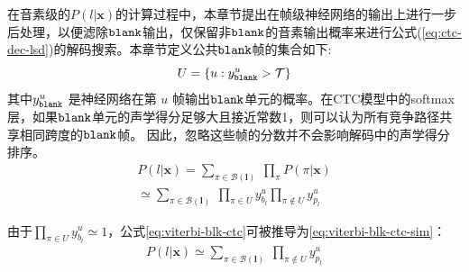 在音素级的$P(l|\mathbf{x})$的计算过程中，本章节提出在帧级神经网络的输出上进行一步后处理，以便滤除$\tt blank$输出，仅保留非$\tt blank$的音素输出概率来进行公式(\ref{eq:ctc-dec-lsd})的解码搜索。本章节定义公共$\tt blank$帧的集合如下:
  \begin{equation} \label{eq:com-blk-idx}
    U=\{u:y^{u}_{\tt{blank}} > \mathcal{T}\}
    \end{equation}
其中$y^{u}_{\tt{blank}}$ 是神经网络在第 $u$ 帧输出$\tt blank$单元的概率。在CTC模型中的softmax层，如果$\tt blank$单元的声学得分足够大且接近常数1，则可以认为所有竞争路径共享相同跨度的$\tt blank$帧。 因此，忽略这些帧的分数并不会影响解码中的声学得分排序。
  \begin{equation} \label{eq:viterbi-blk-ctc}
  \begin{split}
      P(l|\mathbf{x})
      =\sum_{\pi\in\mathcal{B}(\mathbf{l})}
          \ \prod_{\pi}P(\pi|\mathbf{x})\\
        \simeq\sum_{\pi\in\mathcal{B}(\mathbf{l})}
         \  \prod_{\pi\in U}{y_{b_l}^u}{\prod_{\pi\not\in U}{y_{p_l}^u}}
        \end{split}
       \end{equation}


由于$\prod_{\pi\in U}{y_{b_l}^u}\simeq 1$，公式\ref{eq:viterbi-blk-ctc}可被推导为\ref{eq:viterbi-blk-ctc-sim}：
  \begin{equation} \label{eq:viterbi-blk-ctc-sim}
  \begin{split}
      P(l|\mathbf{x})
        \simeq\sum_{\pi\in\mathcal{B}(\mathbf{l})}
         \  {\prod_{\pi\not\in U}{y_{p_l}^u}}
        \end{split}
       \end{equation}

